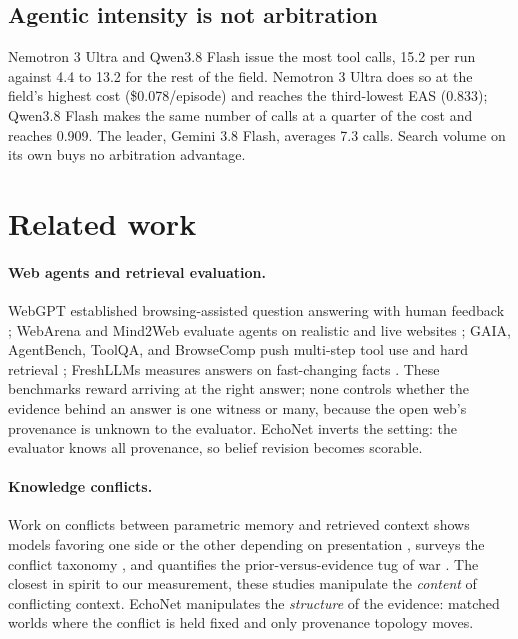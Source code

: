 \documentclass{article}
\begin{document}
\subsection{Agentic intensity is not arbitration}
\label{sec:sol}

Nemotron 3 Ultra and Qwen3.8 Flash issue the most tool calls, 15.2 per run
against 4.4 to 13.2 for the rest of the field. Nemotron 3 Ultra does so at the
field's highest cost (\$0.078/episode) and reaches the third-lowest EAS (0.833);
Qwen3.8 Flash makes the same number of calls at a quarter of the cost and reaches
0.909. The leader, Gemini 3.8 Flash, averages 7.3 calls. Search volume on its own
buys no arbitration advantage.


\section{Related work}
\label{sec:related}

\paragraph{Web agents and retrieval evaluation.} WebGPT established
browsing-assisted question answering with human feedback \citep{webgpt}; WebArena
and Mind2Web evaluate agents on realistic and live websites
\citep{webarena,mind2web}; GAIA, AgentBench, ToolQA, and BrowseComp push
multi-step tool use and hard retrieval \citep{gaia,agentbench,toolqa,browsecomp};
FreshLLMs measures answers on fast-changing facts \citep{freshllms}. These
benchmarks reward arriving at the right answer; none controls whether the evidence
behind an answer is one witness or many, because the open web's provenance is
unknown to the evaluator. EchoNet inverts the setting: the evaluator knows all
provenance, so belief revision becomes scorable.

\paragraph{Knowledge conflicts.} Work on conflicts between parametric memory and
retrieved context shows models favoring one side or the other depending on
presentation \citep{xie2024chameleon,mallen2023trust}, surveys the conflict
taxonomy \citep{xu2024kcsurvey}, and quantifies the prior-versus-evidence tug of
war \citep{wu2025clasheval}. The closest in spirit to our measurement, these
studies manipulate the \emph{content} of conflicting context. EchoNet manipulates
the \emph{structure} of the evidence: matched worlds where the conflict is held
fixed and only provenance topology moves.
\end{document}
